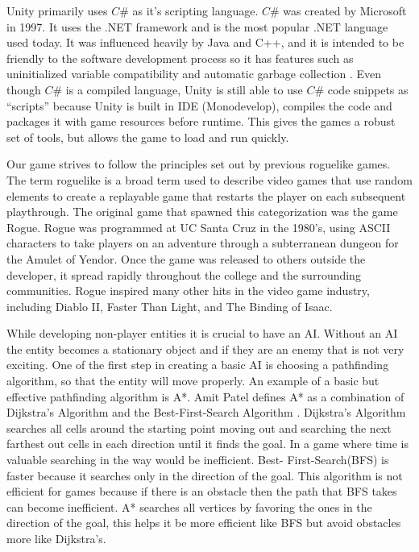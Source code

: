 \documentclass[12pt]{article}       %
\begin{document}
        Unity primarily uses $C\#$ as it’s scripting language. $C\#$ was created by Microsoft in 1997. It uses the .NET framework and is the most popular .NET language used today. It was influenced heavily by Java and C++, and it is intended to be friendly to the software development process so it has features such as uninitialized variable compatibility and automatic garbage collection \cite{Cadet}. Even though $C\#$ is a compiled language, Unity is still able to use $C\#$ code snippets as “scripts” because Unity is built in IDE (Monodevelop), compiles the code and packages it with game resources before runtime. This gives the games a robust set of tools, but allows the game to load and run quickly. \cite{Moles} 

	Our game strives to follow the principles set out by previous roguelike games. The term roguelike is a broad term used to describe video games that use random elements to create a replayable game that restarts the player on each subsequent playthrough. The original game that spawned this categorization was the game Rogue. Rogue was programmed at UC Santa Cruz in the 1980’s, using ASCII characters to take players on an adventure through a subterranean dungeon for the Amulet of Yendor. Once the game was released to others outside the developer, it spread rapidly throughout the college and the surrounding communities. Rogue inspired many other hits in the video game industry, including Diablo II, Faster Than Light, and The Binding of Isaac. \cite{Rogue}

	While developing non-player entities it is crucial to have an AI. Without an AI the entity becomes a stationary object and if they are an enemy that is not very exciting. One of the first step in creating a basic AI is choosing a pathfinding algorithm, so that the entity will move properly. An example of a basic but effective pathfinding algorithm is A*. Amit Patel defines A* as a combination of Dijkstra’s Algorithm and the Best-First-Search Algorithm \cite{A}. Dijkstra’s Algorithm searches all cells around the starting point moving out and searching the next farthest out cells in each direction until it finds the goal. In a game where time is valuable searching in the way would be inefficient. Best- First-Search(BFS) is faster because it searches only in the direction of the goal. This algorithm is not efficient for games because if there is an obstacle then the path that BFS takes can become inefficient. A* searches all vertices by favoring the ones in the direction of the goal, this helps it be more efficient like BFS but avoid obstacles more like Dijkstra’s. \cite{A}
\end{document}
